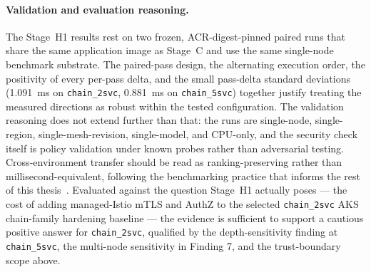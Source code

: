 \paragraph{Validation and evaluation reasoning.}
The Stage~H1 results rest on two frozen, ACR-digest-pinned paired runs that
share the same application image as Stage~C and use the same single-node
benchmark substrate. The paired-pass design, the alternating execution
order, the positivity of every per-pass delta, and the small pass-delta
standard deviations (1.091~ms on \texttt{chain\_2svc}, 0.881~ms on
\texttt{chain\_5svc}) together justify treating the measured directions as
robust within the tested configuration. The validation reasoning does not
extend further than that: the runs are single-node, single-region,
single-mesh-revision, single-model, and CPU-only, and the security check
itself is policy validation under known probes rather than adversarial
testing. Cross-environment transfer should be read as ranking-preserving
rather than millisecond-equivalent, following the benchmarking practice
that informs the rest of this thesis~\cite{benchmarking_sc15}. Evaluated
against the question Stage~H1 actually poses --- the cost of adding
managed-Istio mTLS and AuthZ to the selected \texttt{chain\_2svc} AKS
chain-family hardening baseline --- the evidence is
sufficient to support a cautious positive answer for \texttt{chain\_2svc},
qualified by the depth-sensitivity finding at \texttt{chain\_5svc}, the
multi-node sensitivity in Finding 7, and the trust-boundary scope above.

